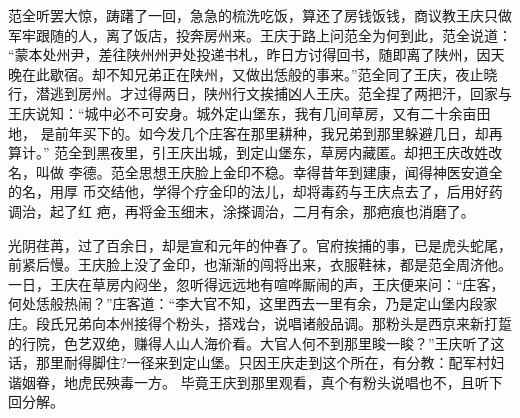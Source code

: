 范全听罢大惊，踌躇了一回，急急的梳洗吃饭，算还了房钱饭钱，商议教王庆只做
军牢跟随的人，离了饭店，投奔房州来。王庆于路上问范全为何到此，范全说道：
“蒙本处州尹，差往陕州州尹处投递书札，昨日方讨得回书，随即离了陕州，因天
晚在此歇宿。却不知兄弟正在陕州，又做出恁般的事来。”范全同了王庆，夜止晓
行，潜逃到房州。才过得两日，陕州行文挨捕凶人王庆。范全捏了两把汗，回家与
王庆说知：“城中必不可安身。城外定山堡东，我有几间草房，又有二十余亩田地，
是前年买下的。如今发几个庄客在那里耕种，我兄弟到那里躲避几日，却再算计。”
范全到黑夜里，引王庆出城，到定山堡东，草房内藏匿。却把王庆改姓改名，叫做
李德。范全思想王庆脸上金印不稳。幸得昔年到建康，闻得神医安道全的名，用厚
币交结他，学得个疗金印的法儿，却将毒药与王庆点去了，后用好药调治，起了红
疤，再将金玉细末，涂搽调治，二月有余，那疤痕也消磨了。

光阴荏苒，过了百余日，却是宣和元年的仲春了。官府挨捕的事，已是虎头蛇尾，
前紧后慢。王庆脸上没了金印，也渐渐的闯将出来，衣服鞋袜，都是范全周济他。
一日，王庆在草房内闷坐，忽听得远远地有喧哗厮闹的声，王庆便来问：“庄客，
何处恁般热闹？”庄客道：“李大官不知，这里西去一里有余，乃是定山堡内段家
庄。段氏兄弟向本州接得个粉头，搭戏台，说唱诸般品调。那粉头是西京来新打踅
的行院，色艺双绝，赚得人山人海价看。大官人何不到那里睃一睃？”王庆听了这
话，那里耐得脚住?一径来到定山堡。只因王庆走到这个所在，有分教：配军村妇
谐姻眷，地虎民殃毒一方。
毕竟王庆到那里观看，真个有粉头说唱也不，且听下回分解。